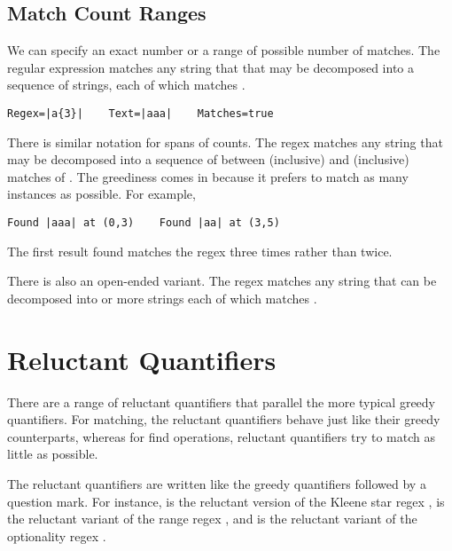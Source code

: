 \subsection{Match Count Ranges}

We can specify an exact number or a range of possible number of
matches.  The regular expression 
matches any string that that may be decomposed into a sequence of
 strings, each of which matches .
%
\begin{verbatim}
Regex=|a{3}|    Text=|aaa|    Matches=true
\end{verbatim}
%

There is similar notation for spans of counts.  The regex
 matches any string that
may be decomposed into a sequence of between  (inclusive)
and  (inclusive) matches of .  The greediness
comes in because it prefers to match as many instances as possible.
For example,
%
\begin{verbatim}
Found |aaa| at (0,3)    Found |aa| at (3,5)
\end{verbatim}
%
The first result found matches the regex  three times
rather than twice.  

There is also an open-ended variant.  The regex
 matches any string that can be
decomposed into  or more strings each of which matches
.

\section{Reluctant Quantifiers}

There are a range of reluctant quantifiers that parallel the more
typical greedy quantifiers.  For matching, the reluctant quantifiers
behave just like their greedy counterparts, whereas for find
operations, reluctant quantifiers try to match as little as possible.

The reluctant quantifiers are written like the greedy quantifiers
followed by a question mark.  For instance,   is
the reluctant version of the Kleene star regex ,
 is the reluctant variant of the range regex
, and  is the reluctant
variant of the optionality regex .

